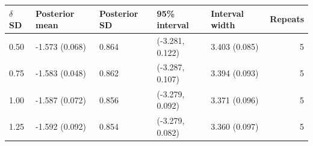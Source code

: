 \begin{tabular}{lllllr}
\toprule
$\delta$ SD & Posterior mean & Posterior SD & 95\% interval & Interval width & Repeats \\
\midrule
0.50 & -1.573 (0.068) & 0.864 & (-3.281, 0.122) & 3.403 (0.085) & 5 \\
0.75 & -1.583 (0.048) & 0.862 & (-3.287, 0.107) & 3.394 (0.093) & 5 \\
1.00 & -1.587 (0.072) & 0.856 & (-3.279, 0.092) & 3.371 (0.096) & 5 \\
1.25 & -1.592 (0.092) & 0.854 & (-3.279, 0.082) & 3.360 (0.097) & 5 \\
\bottomrule
\end{tabular}
